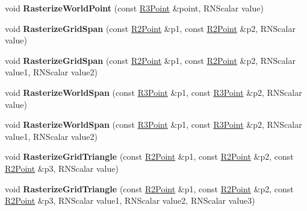 \begin{DoxyCompactItemize}
\item 
void {\bfseries Rasterize\+World\+Point} (const \hyperlink{class_r3_point}{R3\+Point} \&point, R\+N\+Scalar value)\hypertarget{class_r3_planar_grid_a314704e57b482551c6ee0295b0504d48}{}\label{class_r3_planar_grid_a314704e57b482551c6ee0295b0504d48}

\item 
void {\bfseries Rasterize\+Grid\+Span} (const \hyperlink{class_r2_point}{R2\+Point} \&p1, const \hyperlink{class_r2_point}{R2\+Point} \&p2, R\+N\+Scalar value)\hypertarget{class_r3_planar_grid_a9d9cd237b3c1c3f51f7f902289111e61}{}\label{class_r3_planar_grid_a9d9cd237b3c1c3f51f7f902289111e61}

\item 
void {\bfseries Rasterize\+Grid\+Span} (const \hyperlink{class_r2_point}{R2\+Point} \&p1, const \hyperlink{class_r2_point}{R2\+Point} \&p2, R\+N\+Scalar value1, R\+N\+Scalar value2)\hypertarget{class_r3_planar_grid_a1704efc1be2a916fd80e0939a5c920de}{}\label{class_r3_planar_grid_a1704efc1be2a916fd80e0939a5c920de}

\item 
void {\bfseries Rasterize\+World\+Span} (const \hyperlink{class_r3_point}{R3\+Point} \&p1, const \hyperlink{class_r3_point}{R3\+Point} \&p2, R\+N\+Scalar value)\hypertarget{class_r3_planar_grid_ac44ddd3352aa3409e32e3755add454a6}{}\label{class_r3_planar_grid_ac44ddd3352aa3409e32e3755add454a6}

\item 
void {\bfseries Rasterize\+World\+Span} (const \hyperlink{class_r3_point}{R3\+Point} \&p1, const \hyperlink{class_r3_point}{R3\+Point} \&p2, R\+N\+Scalar value1, R\+N\+Scalar value2)\hypertarget{class_r3_planar_grid_aa3f859ac52251d80488050606043ce0c}{}\label{class_r3_planar_grid_aa3f859ac52251d80488050606043ce0c}

\item 
void {\bfseries Rasterize\+Grid\+Triangle} (const \hyperlink{class_r2_point}{R2\+Point} \&p1, const \hyperlink{class_r2_point}{R2\+Point} \&p2, const \hyperlink{class_r2_point}{R2\+Point} \&p3, R\+N\+Scalar value)\hypertarget{class_r3_planar_grid_aa0f0e716301a3853fec576372bbb9a81}{}\label{class_r3_planar_grid_aa0f0e716301a3853fec576372bbb9a81}

\item 
void {\bfseries Rasterize\+Grid\+Triangle} (const \hyperlink{class_r2_point}{R2\+Point} \&p1, const \hyperlink{class_r2_point}{R2\+Point} \&p2, const \hyperlink{class_r2_point}{R2\+Point} \&p3, R\+N\+Scalar value1, R\+N\+Scalar value2, R\+N\+Scalar value3)\hypertarget{class_r3_planar_grid_a22d3dfb2f3176f66d589a99eb029826e}{}\label{class_r3_planar_grid_a22d3dfb2f3176f66d589a99eb029826e}


\end{DoxyCompactItemize}
